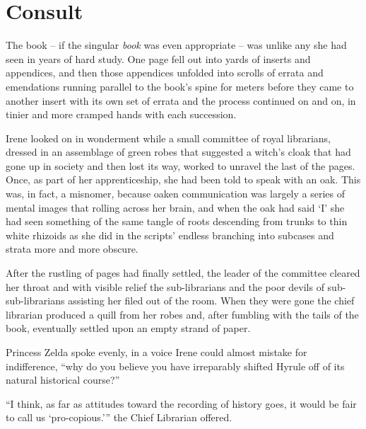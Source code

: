 \documentclass[../FGP.tex]{subfiles}
\begin{document}
\section{Consult}
\begin{fragment}The book -- if the singular \emph{book} was even appropriate -- was unlike any she had seen in years of hard study. One page fell out into yards of inserts and appendices, and then those appendices unfolded into scrolls of errata and emendations running parallel to the book's spine for meters before they came to another insert with its own set of errata and the process continued on and on, in tinier and more cramped hands with each succession. 

Irene looked on in wonderment while a small committee of royal librarians, dressed in an assemblage of green robes that suggested a witch's cloak that had gone up in society and then lost its way, worked to unravel the last of the pages. Once, as part of her apprenticeship, she had been told to speak with an oak. This was, in fact, a misnomer, because oaken communication was largely a series of  mental images that  rolling across her brain, and when the oak had said `I' she had seen something of the same tangle of roots descending from trunks to thin white rhizoids as she did in the scripts' endless branching into subcases and strata more and more obscure.  

After the rustling of pages had finally settled, the leader of the committee cleared her throat and with visible relief the sub-librarians and the poor devils of sub-sub-librarians assisting her filed out of the room. When they were gone the chief librarian produced a quill from her robes and, after fumbling with the tails of the book, eventually settled upon an empty strand of paper. 

Princess Zelda spoke evenly, in a voice Irene could almost mistake for indifference, ``why do you believe you have irreparably shifted Hyrule off of its natural historical course?''  
\end{fragment}

\begin{fragment}
``I think, as far as attitudes toward the recording of history goes, it would be fair to call us `pro-copious.'{''} the Chief Librarian offered. 
\end{fragment}
\end{document}
